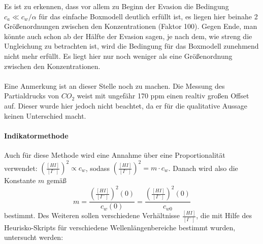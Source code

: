 \documentclass[12pt]{article}
\begin{document}
Es ist zu erkennen, dass vor allem zu Beginn der Evasion die Bedingung $c_a \ll c_w/\alpha $ für das einfache Boxmodell deutlich erfüllt ist, es liegen hier beinahe 2 Größenordnungen zwischen den Konzentrationen (Faktor 100). Gegen Ende, man könnte auch schon ab der Hälfte der Evasion sagen, je nach dem, wie streng die Ungleichung zu betrachten ist, wird die Bedingung für das Boxmodell zunehmend nicht mehr erfüllt. Es liegt hier nur noch weniger als eine Größenordnung zwischen den Konzentrationen. \\\\
Eine Anmerkung ist an dieser Stelle noch zu machen. Die Messung des Partialdrucks von $CO_2$ weist mit ungefähr 170 ppm einen realtiv großen Offset auf. Dieser wurde hier jedoch nicht beachtet, da er für die qualitative Aussage keinen Unterschied macht.

\paragraph{Indikatormethode\\}

Auch für diese Methode wird eine Annahme über eine Proportionalität verwendet: $(\frac{[HI]}{[I^-]})^2 \propto c_w $, sodass $(\frac{[HI]}{[I^-]})^2 = m \cdot c_w $. Danach wird also die Konstante $m$ gemäß
\begin{equation}
m = \frac{(\frac{[HI]}{[I^-]})^2(0)}{c_w(0)} = \frac{(\frac{[HI]}{[I^-]})^2(0)}{c_{w0}} 
\end{equation}
bestimmt. Des Weiteren sollen verschiedene Verhältnisse $\frac{[HI]}{[I^-]}$, die mit Hilfe des Heurisko-Skripts für verschiedene Wellenlängenbereiche bestimmt wurden, untersucht werden: 
\end{document}
